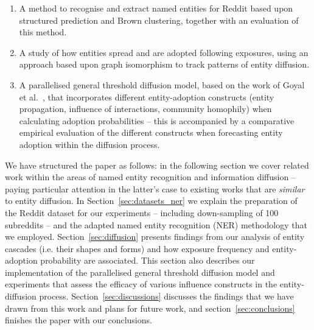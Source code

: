 \documentclass[acmsmall]{acmart}
\begin{document}
\begin{enumerate}
	\item A method to recognise and extract named entities for Reddit based upon structured prediction and Brown clustering, together with an evaluation of this method.
	\item A study of how entities spread and are adopted following exposures, using an approach based upon graph isomorphism to track patterns of entity diffusion.
	\item A parallelised general threshold diffusion model, based on the work of Goyal et al.~\cite{goyal2010learning}, that incorporates different entity-adoption constructs (entity propagation, influence of interactions, community homophily) when calculating adoption probabilities -- this is accompanied by a comparative empirical evaluation of the different constructs when forecasting entity adoption within the diffusion process.
\end{enumerate}

We have structured the paper as follows: in the following section we cover related work within the areas of named entity recognition and information diffusion -- paying particular attention in the latter's case to existing works that are \emph{similar} to entity diffusion.
In Section~\ref{sec:datasets_ner} we explain the preparation of the Reddit dataset for our experiments -- including down-sampling of 100 subreddits -- and the adapted named entity recognition (NER) methodology that we employed.
Section~\ref{sec:diffusion} presents findings from our analysis of entity cascades (i.e. their shapes and forms) and how exposure frequency and entity-adoption probability are associated.
This section also describes our implementation of the parallelised general threshold diffusion model and experiments that assess the efficacy of various influence constructs in the entity-diffusion process.
Section~\ref{sec:discussions} discusses the findings that we have drawn from this work and plans for future work, and section~\ref{sec:conclusions} finishes the paper with our conclusions.
\end{document}
